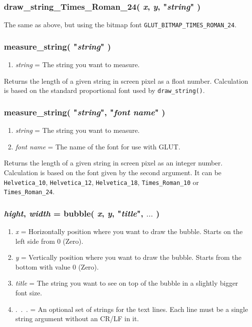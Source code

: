 \documentclass[11pt,parskip=half,a4paper]{scrartcl}
\begin{document}
\subsubsection{draw\_string\_Times\_Roman\_24( \emph{x}, \emph{y}, "\emph{string}" )}

The same as above, but using the bitmap font \verb|GLUT_BITMAP_TIMES_ROMAN_24|.


\subsubsection{measure\_string( "\emph{string}" )}

\begin{enumerate}
	\item \emph{string} = The string you want to measure.
\end{enumerate}

Returns the length of a given string in screen pixel as a float number. Calculation is based on the standard proportional font used by \verb|draw_string()|.

\subsubsection{measure\_string( "\emph{string}", "\emph{font name}" )}

\begin{enumerate}
	\item \emph{string} = The string you want to measure.
	\item \emph{font name} = The name of the font for use with GLUT.
\end{enumerate}

Returns the length of a given string in screen pixel as an integer number. Calculation is based on the font given by the second argument. It can be \verb|Helvetica_10|, \verb|Helvetica_12|, \verb|Helvetica_18|, \verb|Times_Roman_10| or \verb|Times_Roman_24|.

\subsubsection{\emph{hight}, \emph{width} = bubble( \emph{x}, \emph{y}, "\emph{title}", $\dots$ )}

\begin{enumerate}
	\item \emph{x} = Horizontally position where you want to draw the bubble. Starts on the left side from 0 (Zero).
	\item \emph{y} = Vertically position where you want to draw the bubble. Starts from the bottom with value 0 (Zero).
	\item \emph{title} = The string you want to see on top of the bubble in a slightly bigger font size.
	\item .~.~. = An optional set of strings for the text lines. Each line must be a single string argument without an CR/LF in it.
\end{enumerate}
\end{document}
